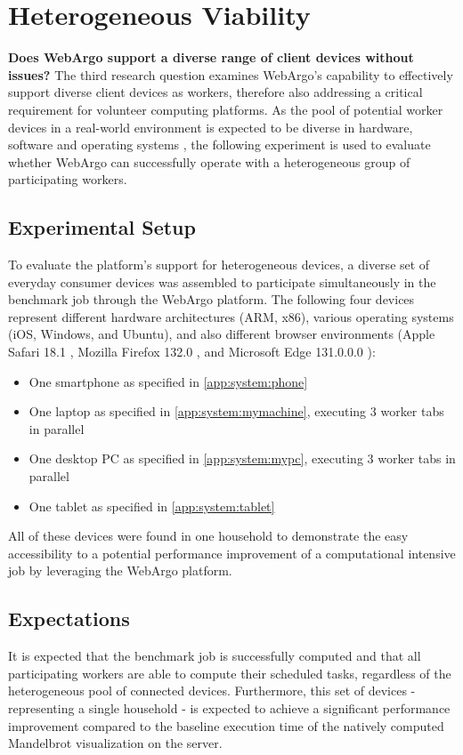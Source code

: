 \section{Heterogeneous Viability}
\label{sec:evaluation:heterogen}
\textbf{Does WebArgo support a diverse range of client devices without issues?}
The third research question examines WebArgo's capability to effectively support diverse client devices as workers, therefore also addressing a critical requirement for volunteer computing platforms. As the pool of potential worker devices in a real-world environment is expected to be diverse in hardware, software and operating systems \cite{intro:diverseDevices}, the following experiment is used to evaluate whether WebArgo can successfully operate with a heterogeneous group of participating workers.

\subsection{Experimental Setup}
To evaluate the platform's support for heterogeneous devices, a diverse set of everyday consumer devices was assembled to participate simultaneously in the benchmark job through the WebArgo platform. The following four devices represent different hardware architectures (ARM, x86), various operating systems (iOS, Windows, and Ubuntu), and also different browser environments (Apple Safari 18.1 \cite{evaluation:safari}, Mozilla Firefox 132.0 \cite{background:firefox}, and Microsoft Edge 131.0.0.0 \cite{evaluation:edge}):
\begin{itemize}
    \item One smartphone as specified in \autoref{app:system:phone}
    \item One laptop as specified in \autoref{app:system:mymachine}, executing 3 worker tabs in parallel
    \item One desktop \ac{PC} as specified in \autoref{app:system:mypc}, executing 3 worker tabs in parallel
    \item One tablet as specified in \autoref{app:system:tablet}
\end{itemize}
All of these devices were found in one household to demonstrate the easy accessibility to a potential performance improvement of a computational intensive job by leveraging the WebArgo platform.

\subsection{Expectations}
It is expected that the benchmark job is successfully computed and that all participating workers are able to compute their scheduled tasks, regardless of the heterogeneous pool of connected devices. Furthermore, this set of devices - representing a single household - is expected to achieve a significant performance improvement compared to the baseline execution time of the natively computed Mandelbrot visualization on the server.  

